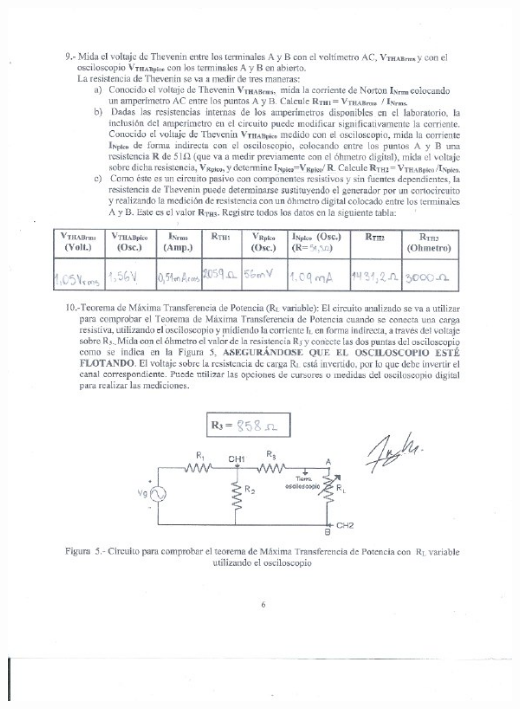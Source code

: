 \documentclass[12pt]{article}
\begin{document}
	\includegraphics[width=16cm,height=21cm]{Img/Resultados_4}\\
\end{document}
